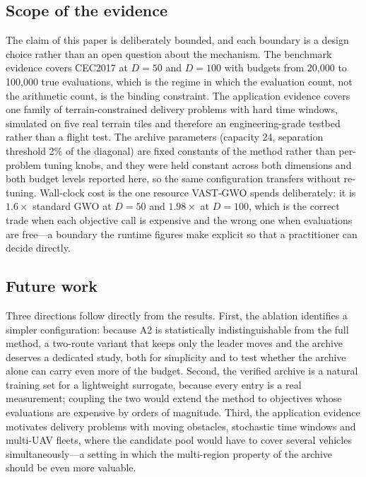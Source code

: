 \documentclass[11pt,a4paper]{article}
\newcommand{\method}{VAST-GWO}
\begin{document}
\subsection{Scope of the evidence}
The claim of this paper is deliberately bounded, and each boundary is a design
choice rather than an open question about the mechanism. The benchmark
evidence covers CEC2017 at $D=50$ and $D=100$ with budgets from 20{,}000 to
100{,}000 true evaluations, which is the regime in which the evaluation count,
not the arithmetic count, is the binding constraint. The application evidence
covers one family of terrain-constrained delivery problems with hard time
windows, simulated on five real terrain tiles and therefore an
engineering-grade testbed rather than a flight test. The archive parameters
(capacity 24, separation threshold 2\% of the diagonal) are fixed constants of
the method rather than per-problem tuning knobs, and they were held constant
across both dimensions and both budget levels reported here, so the same
configuration transfers without re-tuning. Wall-clock cost is the one resource
\method{} spends deliberately: it is $1.6\times$ standard GWO at $D=50$ and
$1.98\times$ at $D=100$, which is the correct trade when each objective call is
expensive and the wrong one when evaluations are free---a boundary the runtime
figures make explicit so that a practitioner can decide directly.

\subsection{Future work}
Three directions follow directly from the results. First, the ablation
identifies a simpler configuration: because A2 is statistically
indistinguishable from the full method, a two-route variant that keeps only the
leader moves and the archive deserves a dedicated study, both for simplicity
and to test whether the archive alone can carry even more of the budget.
Second, the verified archive is a natural training set for a lightweight
surrogate, because every entry is a real measurement; coupling the two would
extend the method to objectives whose evaluations are expensive by orders of
magnitude. Third, the application evidence motivates delivery problems with
moving obstacles, stochastic time windows and multi-UAV fleets, where the
candidate pool would have to cover several vehicles simultaneously---a setting
in which the multi-region property of the archive should be even more valuable.
\end{document}
